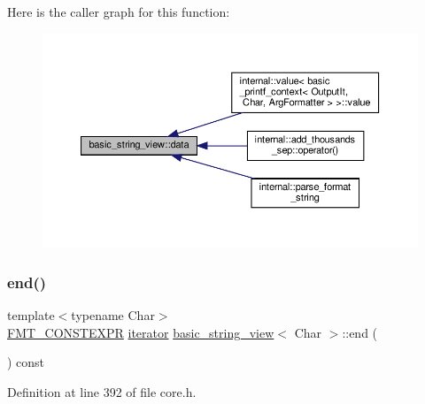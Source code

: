 Here is the caller graph for this function\+:
\nopagebreak
\begin{figure}[H]
\begin{center}
\leavevmode
\includegraphics[width=350pt]{classbasic__string__view_a48c221f626c53e68f6d63105329f6b08_icgraph}
\end{center}
\end{figure}
\mbox{\label{classbasic__string__view_a7d262051736a662df0f35d6e39ebf773}} 
\subsubsection{\texorpdfstring{end()}{end()}}
{\footnotesize\ttfamily template$<$typename Char$>$ \\
\hyperlink{core_8h_a69201cb276383873487bf68b4ef8b4cd}{F\+M\+T\+\_\+\+C\+O\+N\+S\+T\+E\+X\+PR} \hyperlink{classbasic__string__view_aac52df0e56cb4b197372306e0da039e0}{iterator} \hyperlink{classbasic__string__view}{basic\+\_\+string\+\_\+view}$<$ Char $>$\+::end (\begin{DoxyParamCaption}{ }\end{DoxyParamCaption}) const\hspace{0.3cm}{\ttfamily [inline]}}



Definition at line 392 of file core.\+h.

